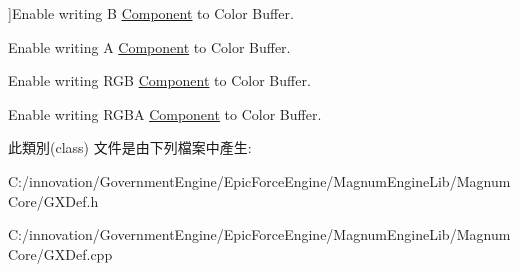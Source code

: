 \begin{Desc}
\begin{description}
{}]Enable writing B \hyperlink{class_i_dream_sky_1_1_component}{Component} to Color Buffer. \item[{\em 
A\hypertarget{class_i_dream_sky_1_1_g_x_color_mask_a5e0981194bd89cddc402cd085318f8bba8bdc786778ad6362fd631498b14691b9}{}\label{class_i_dream_sky_1_1_g_x_color_mask_a5e0981194bd89cddc402cd085318f8bba8bdc786778ad6362fd631498b14691b9}
}]Enable writing A \hyperlink{class_i_dream_sky_1_1_component}{Component} to Color Buffer. \item[{\em 
Rgb\hypertarget{class_i_dream_sky_1_1_g_x_color_mask_a5e0981194bd89cddc402cd085318f8bbac00e2cfeabfde3e8fa3cedfa71504d2a}{}\label{class_i_dream_sky_1_1_g_x_color_mask_a5e0981194bd89cddc402cd085318f8bbac00e2cfeabfde3e8fa3cedfa71504d2a}
}]Enable writing R\+GB \hyperlink{class_i_dream_sky_1_1_component}{Component} to Color Buffer. \item[{\em 
Rgba\hypertarget{class_i_dream_sky_1_1_g_x_color_mask_a5e0981194bd89cddc402cd085318f8bbac7d7acfee6fabaad2dadc615db28af6d}{}\label{class_i_dream_sky_1_1_g_x_color_mask_a5e0981194bd89cddc402cd085318f8bbac7d7acfee6fabaad2dadc615db28af6d}
}]Enable writing R\+G\+BA \hyperlink{class_i_dream_sky_1_1_component}{Component} to Color Buffer. \end{description}
\end{Desc}


此類別(class) 文件是由下列檔案中產生\+:\begin{DoxyCompactItemize}
\item 
C\+:/innovation/\+Government\+Engine/\+Epic\+Force\+Engine/\+Magnum\+Engine\+Lib/\+Magnum\+Core/G\+X\+Def.\+h\item 
C\+:/innovation/\+Government\+Engine/\+Epic\+Force\+Engine/\+Magnum\+Engine\+Lib/\+Magnum\+Core/G\+X\+Def.\+cpp\end{DoxyCompactItemize}
